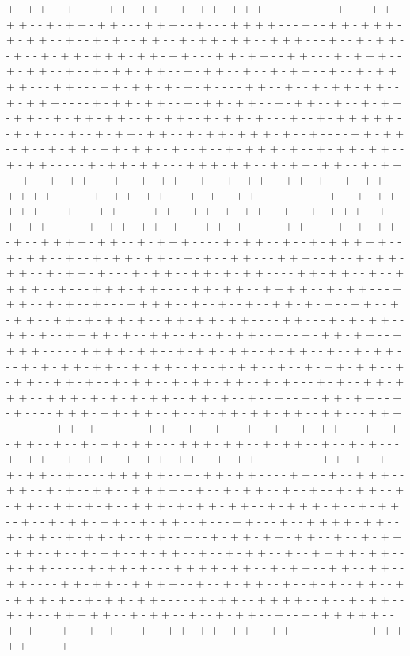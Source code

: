 + - + + - - + - - - - + + - + + - - + - + + - + + + - + - - + - - - + - - - + + - + + - - + - + + - + + - - - + + + - - + - - - + + + + - - - + - - + + - + + + - + - + + - - + - - + - + - - + + - - + - + + - + + - - + + + - - - + - - + - + + - - + - - + - + + - + + + - + + - + + - - - + + - + + - - + + - - - + - + + + - - + - + + - - + - - + - + + - + + - - + - + + - - + - - + - + + - - + - - + - + + + + - - - + + - - - + + - + + - + - + - + - - - - + + - - + - - + - + + - + + - - + - + + + - - - - + - + + - + + - - + - + + - + + - - + - + + - - + - - + - + + - + + - - + - + + - + + - - + - + + - - + - + + - + - - - + - - + - + + + + + - - + - + - - - + - - + - + + - + + - - + - + + - + + + - + - - + - - - - + + - + + - - + - - + - + + - + + - + + - - + - - + - - + - + + + - + - - + - + + - + + - - + - + + - - - - - + - + + - + + - - - + + + - + + - - + - + + - + + - - + - + + - - + - - + - + + - + + - - + - + + - - + - - + - + + - - + + - + - - + - + + - - + + + + - - - - - + - + + - + + + - + - + - - + + - - + - - + - - + - - + - + + - + + + - - - + + - + + - - - - + + - - + + - + - + + - - + - - + - + + + + + - - + - + + - - - - - + - + + - + + - + + - + + - + - - - - - + + - - + + - + - + + - - + - - + + + + - + + - - + - + + + - - - - + - + + - - + - - + - + + + + + - - + - + + - - + - - + - + + - + + - - + - + - - + + - - - + + + - - + - - + - + + - + + - - + - + + - + - - - + - + + - - + + - + - + + - - - - + + - + + - - + - - + + + + - - + - - - + + + - + + - - - - + + - + + - - + + + + - - + - + + - - - + + + - - + - + - - + - - - + + + + - - + - - + - - + - - + + - + - + - - + + - - + - + + - - + + - + - + + - + - - + + - + + - + + - - - - + + - - - + - + - + + - - + + - + - - + + + + - + - - + + - - + - - + - + + - - + - - + - + + - + + - - + + + + - - - - - + + + + - + + - - + - + + - + + - - + - + + - - + - - + - + + - - - + - + - + + - + + - - + - + + - - + - - + - + + - - + - - + - + + - + + - - + - + + - - + + - + - - + - + + - - + - + + - + + - - + - + - - - + - + - - + + - + + + - - + + + - + - + - + - + + - - + + - + - - + - - + - - + - + + - + + - - + - + - - - - + + + - + + - + + - - + - - + - + + - + + - + + - - + + - - - + + + - - - - + - + + - + + - - + - + + - - + - - + - + + - - + - - + - + + - + + - - + - + + - - + - - + - + + - + + - - - + + + - + + - - + - + + - - + - - + - + - - - + - + + - - + - + + - - + - + + - + + - - + - + + - - + - - + - + + - + + + - + - + + - - + - - - - + + + + + - - + - + + - + + - - - - + + - - + - - + + + - - + + - - + - + - - + + - - + + + + - - + - - + - + + - - + - - + - - + - + + - - + - + + - - + + - + - + - - + + + - + - + + - + + - - + - + + + - + - - + - + + - - + - - + - + + - + + - - + - + + - - + - - - + + - - - + - - + + + + - + + - - + - + + - - + - + + - + - - + + - - + - - + - + + - + + - + + - - + - - + - + + - + + - - + - - + - + + - - + - + + - - + - - + - + + - - + - - + + + + - + + - - + - + + - - - - - + - + + - + - - - + + + + - + + - - + - + + - - + + - - + + - - + + - - - - + + - + + - - + + + + - - + - - + - + + - - + - - + - + - - + + - - + - + + + - + - - + - + + - + + - - - - - + - + + - - + + + + - - + - - + - + + - - + - + - - + + + + + - - + - + + - - + - - + - + + - - + - - + - + + + + + - - + - + - - - + - - + - + - + + - - + + - + + - + + - - + + - + - - - - - + - + + + + + - - - - + 